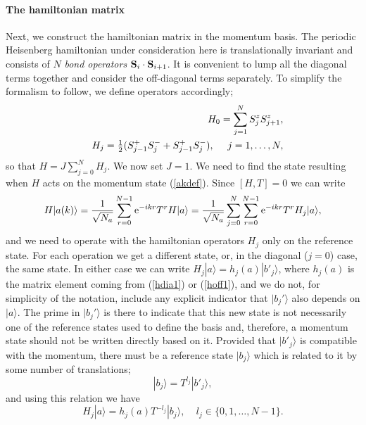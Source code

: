 \documentclass[draft,numberedheadings]{aipproc}
\newcommand{\half}{\hbox{$\frac{1}{2}$}}
\begin{document}
\paragraph{The hamiltonian matrix}

Next, we construct the hamiltonian matrix in the momentum basis. The periodic Heisenberg hamiltonian under consideration here is translationally 
invariant and consists of $N$ {\it bond operators} ${\bf S}_i\cdot {\bf S}_{i+1}$. It is convenient to lump all the diagonal terms together and consider 
the off-diagonal terms separately. To simplify the formalism to follow, we define operators accordingly;
\begin{eqnarray}
&&H_0 =  \sum_{j=1}^N S^z_jS^z_{j+1}, \label{hdia1}\\
&&H_j =  \half(S^+_{j-1}S^-_{j} + S^+_{j-1}S^-_{j}),~~~~j=1,\ldots,N,\label{hoff1}
\end{eqnarray}
so that $H=J\sum_{j=0}^N H_j$. We now set $J=1$. We need to find the state resulting when $H$ acts on the momentum state (\ref{akdef}).
Since $[H,T]=0$ we can write 
\begin{equation}
H|a(k)\rangle = \frac{1}{\sqrt{N_a}} \sum_{r=0}^{N-1} {\rm e}^{-ikr} T^rH|a\rangle
= \frac{1}{\sqrt{N_a}} \sum_{j=0}^N  \sum_{r=0}^{N-1} {\rm e}^{-ikr} T^rH_j|a\rangle,
\label{hoperak1}
\end{equation}
and we need to operate with the hamiltonian operators $H_j$ only on the reference state. For each operation we get a different state, or, in the diagonal
($j=0$) case, the same state. In either case we can write $H_j|a\rangle = h_j(a)|b'_j\rangle$,  where $h_j(a)$ is the matrix element coming from (\ref{hdia1}) or 
(\ref{hoff1}), and we do not, for simplicity of the notation, include any explicit indicator that $|b_j'\rangle$ also depends on $|a\rangle$. The prime 
in $|b_j'\rangle$ is there to indicate that this new state is not necessarily one of the reference states used to define the basis and, therefore, a 
momentum state should not be written directly based on it. Provided that $|b'_j\rangle$ is compatible with the momentum, there must be a reference 
state $|b_j\rangle$ which is related to it by some number of translations;
\begin{equation}
|b_j\rangle = T^{l_j} |b'_j\rangle,
\label{btransrep}
\end{equation}
and using this relation we have
\begin{equation}
H_j|a\rangle = h_j(a)T^{-l_j}|b_j\rangle,~~~~~l_j \in \{ 0,1,\ldots,N-1 \}.
\label{hatransrep}
\end{equation}
\end{document}
